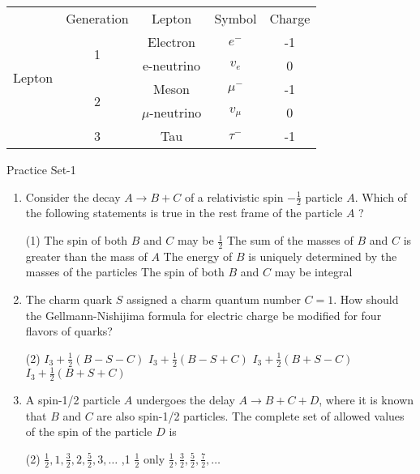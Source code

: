 \begin{tabular}{|c|c|c|c|c|}
	\multirow{6}{*}{Lepton}&Generation&Lepton&Symbol&Charge\\\cline{2-5}
	&\multirow{2}{*}{1}&Electron&$e^-$&-1\\\cline{3-5}
	&&e-neutrino&$v_e$&0\\\cline{2-5}
	&\multirow{2}{*}{2}&Meson&$\mu^-$&-1\\\cline{3-5}
	&&$\mu$-neutrino&$v_\mu$&0\\\cline{2-5}
	&3&Tau&$\tau^-$&-1\\\hline
\end{tabular}
\newpage
\begin{abox}
Practice Set-1
\end{abox}
\begin{enumerate}
	\item  Consider the decay $A \rightarrow B+C$ of a relativistic spin $-\frac{1}{2}$ particle $A$. Which of the following statements is true in the rest frame of the particle $A$ ?
{}	
	 \begin{tasks}(1)
		\task[\textbf{a.}]The spin of both $B$ and $C$ may be $\frac{1}{2}$
		\task[\textbf{b.}]The sum of the masses of $B$ and $C$ is greater than the mass of $A$
		\task[\textbf{c.}]The energy of $B$ is uniquely determined by the masses of the particles
		\task[\textbf{d.}]  The spin of both $B$ and $C$ may be integral
	\end{tasks}
	\item  The charm quark $S$ assigned a charm quantum number $C=1$. How should the Gellmann-Nishijima formula for electric charge be modified for four flavors of quarks?
	{}
	 \begin{tasks}(2)
		\task[\textbf{a.}]$I_3+\frac{1}{2}(B-S-C)$
		\task[\textbf{b.}]$I_3+\frac{1}{2}(B-S+C)$
		\task[\textbf{c.}] $I_3+\frac{1}{2}(B+S-C)$
		\task[\textbf{d.}]$I_3+\frac{1}{2}(B+S+C)$ 
	\end{tasks}
	\item  A spin-1/2 particle $A$ undergoes the delay $A \rightarrow B+C+D$, where it is known that $B$ and $C$ are also spin-1/2 particles. The complete set of allowed values of the spin of the particle $D$ is
	{}
	 \begin{tasks}(2)
		\task[\textbf{a.}]$\frac{1}{2}, 1, \frac{3}{2}, 2, \frac{5}{2}, 3, \ldots$
		,1
		\task[\textbf{c.}]$\frac{1}{2}$ only
		\task[\textbf{d.}]$\frac{1}{2}, \frac{3}{2}, \frac{5}{2}, \frac{7}{2}, \ldots$ 

\end{tasks}
\end{enumerate}
